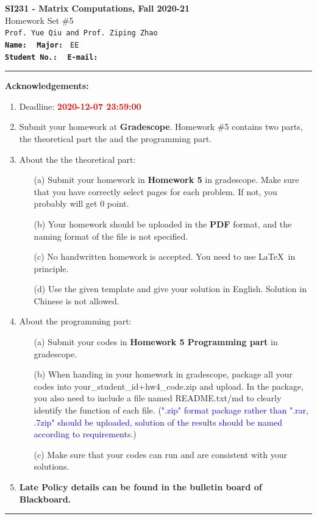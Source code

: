 \documentclass[english,onecolumn]{IEEEtran}
\begin{document}
\begin{center}
	\textbf{\LARGE{SI231 - Matrix Computations, Fall 2020-21}}\\
	{\Large Homework Set \#5}\\
	\texttt{Prof. Yue Qiu and Prof. Ziping Zhao}\\
	\texttt{\textbf{Name:}}   	\texttt{  }  		\hspace{1bp}
	\texttt{\textbf{Major:}}  	\texttt{ EE } 	\\
	\texttt{\textbf{Student No.:}} 	\texttt{ }     \hspace{1bp}
	\texttt{\textbf{E-mail:}} 	\texttt{ }
\par\end{center}

\noindent
\rule{\linewidth}{0.4pt}
{\bf {\large Acknowledgements:}}
\begin{enumerate}
    \item Deadline: \textcolor{red}{\textbf{2020-12-07 23:59:00}}
    \item Submit your homework at \textbf{Gradescope}.
    Homework \#5 contains two parts, the theoretical part the and the programming part.
    \item About the the theoretical part:
    \begin{enumerate}
            \item[(a)] Submit your homework in \textbf{Homework 5} in gradescope. Make sure that you have correctly select pages for each problem. If not, you probably will get 0 point.
            \item[(b)] Your homework should be uploaded in the \textbf{PDF} format, and the naming format of the file is not specified.
            \item[(c)] No handwritten homework is accepted. You need to use \LaTeX $\,$ in principle.
            \item[(d)] Use the given template and give your solution in English. Solution in Chinese is not allowed. 
        \end{enumerate}
  \item About the programming part:
  \begin{enumerate}
      \item[(a)] Submit your codes in \textbf{Homework 5 Programming part} in gradescope. 
      \item[(b)] When handing in your homework in gradescope, package all your codes into {\sf your\_student\_id+hw4\_code.zip} and upload. In the package, you also need to include a file named {\sf README.txt/md} to clearly identify the function of each file. (\textcolor{blue}{".zip" format package rather than ".rar, .7zip" should be uploaded, solution of the results should be named according to requirements}.)
     \item[(c)] Make sure that your codes can run and are consistent with your solutions.
  \end{enumerate}
  \item \textbf{Late Policy details can be found in the bulletin board of Blackboard.}
\end{enumerate}
\rule{\linewidth}{0.4pt}
\end{document}
